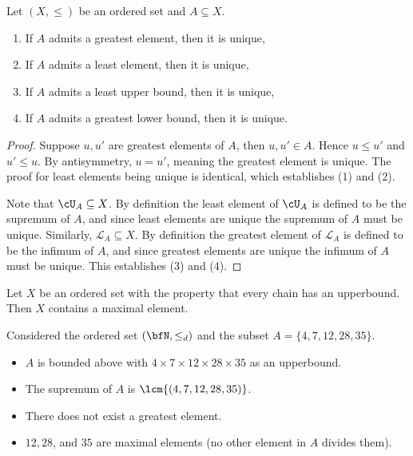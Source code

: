     \begin{proposition}
        Let $(X , \leq)$ be an ordered set and $A \subseteq X$.
        \begin{enumerate}[label = (\arabic*)]
            \item If $A$ admits a greatest element, then it is unique, %
            \item If $A$ admits a least element, then it is unique,
            \item If $A$ admits a least upper bound, then it is unique,
            \item If $A$ admits a greatest lower bound, then it is unique.
        \end{enumerate}
    \end{proposition}
        \begin{proof}
            Suppose $u,u'$ are greatest elements of $A$, then $u,u' \in A$. Hence $u \leq u'$ and $u' \leq u$. By antisymmetry, $u = u'$, meaning the greatest element is unique. The proof for least elements being unique is identical, which establishes (1) and (2). 

            Note that $\cU_A  \subseteq X$. By definition the least element of $\cU_A$ is defined to be the supremum of $A$, and since least elements are unique the supremum of $A$ must be unique.  Similarly, $\mathscr{L}_A \subseteq X$. By definition the greatest element of $\mathscr{L}_A$ is defined to be the infimum of $A$, and since greatest elements are unique the infimum of $A$ must be unique. This establishes (3) and (4).
        \end{proof}

    \begin{lemma}\label{lemma:zorns}
        Let $X$ be an ordered set with the property that every chain has an upperbound. Then $X$ contains a maximal element.
    \end{lemma}

    \begin{example}
        Considered the ordered set $(\bfN,\leq_d)$ and the subset $A = \{4,7,12,28,35\}$.
            \begin{itemize}
                \item $A$ is bounded above with $4\times7\times12\times28\times35$ as an upperbound.
                \item The supremum of $A$ is $\lcm{(4,7,12,28,35)}$. 
                \item There does not exist a greatest element.
                \item $12,28$, and $35$ are maximal elements (no other element in $A$ divides them).
            \end{itemize}
    \end{example}

